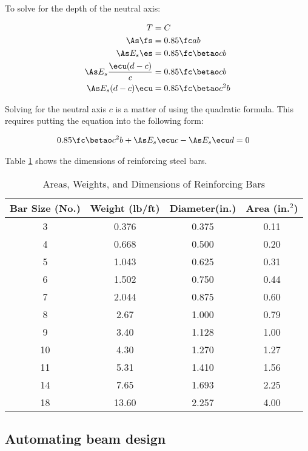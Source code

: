 To solve for the depth of the neutral axis:

\begin{align}
	T &= C\\
	\As\fs &=0.85\fc a b\\ 
	\As E_s \es &= 0.85\fc \betao c b\\
	\As E_s \frac{\ecu(d-c)}{c} &= 0.85\fc \betao c b\\
	\As E_s (d-c) \ecu &= 0.85 \fc \betao c^2 b\\ 
\end{align}

Solving for the neutral axis $c$ is a matter of using the quadratic formula. This requires putting the equation into the following form:

\begin{align}
		0.85 \fc \betao c^2 b + \As E_s \ecu c - \As E_s \ecu d &= 0
		\label{Eq:neutralaxis}
\end{align}


Table \ref{Tab:bars} shows the dimensions of reinforcing steel bars.

\begin{table}[h]
\centering
\caption{Areas, Weights, and Dimensions of Reinforcing Bars}
\label{Tab:bars}
\begin{tabular}{|c|c|c|c|}\hline
Bar Size (No.)&Weight (lb/ft)&Diameter(in.)&Area (in.$^2$) \\ \hline
3&0.376&0.375&0.11 \\ \hline
4&0.668&0.500&0.20 \\ \hline
5&1.043&0.625&0.31 \\ \hline
6&1.502&0.750&0.44 \\ \hline
7&2.044&0.875&0.60 \\ \hline
8&2.67&1.000&0.79 \\ \hline
9&3.40&1.128&1.00 \\ \hline
10&4.30&1.270&1.27 \\ \hline
11&5.31&1.410&1.56 \\ \hline
14&7.65&1.693&2.25 \\ \hline
18&13.60&2.257&4.00 \\ \hline
\end{tabular}
\end{table}



\subsection{Automating beam design}


